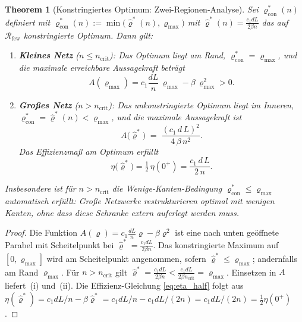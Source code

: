 ﻿\documentclass[12pt, a4paper, openany]{report}
\newtheorem{theorem}{Theorem}[chapter]
\newcommand{\calR}{\mathcal{R}}
\begin{document}
\begin{theorem}[Konstringiertes Optimum: Zwei-Regionen-Analyse]
\label{thm:scaling}
Sei $\varrho^*_{\mathrm{con}}(n)$ definiert mit $\varrho^*_{\mathrm{con}}(n) := \min\!\bigl(\hat{\varrho}^*(n),
\varrho_{\max}\bigr)$ mit $\hat{\varrho}^*(n) = \frac{c_1 d L}{2\beta n}$
das auf $\calR_{\mathrm{few}}$ konstringierte Optimum.  Dann gilt:
\begin{enumerate}[label=(\roman*)]
  \item \textbf{Kleines Netz} ($n \leq n_{\mathrm{crit}}$):
    Das Optimum liegt am Rand, $\varrho^*_{\mathrm{con}} = \varrho_{\max}$,
    und die maximale erreichbare Aussagekraft beträgt
    \[
      A(\varrho_{\max})
      = c_1 \frac{d L}{n}\,\varrho_{\max} - \beta\,\varrho_{\max}^2
      > 0.
    \]
  \item \textbf{Großes Netz} ($n > n_{\mathrm{crit}}$):
    Das unkonstringierte Optimum liegt im Inneren,
    $\varrho^*_{\mathrm{con}} = \hat{\varrho}^*(n) < \varrho_{\max}$,
    und die maximale Aussagekraft ist
    \begin{equation}
      \label{eq:A_opt}
      A\!\bigl(\hat{\varrho}^*\bigr)
      \;=\; \frac{(c_1\,d\,L)^2}{4\,\beta\,n^2}.
    \end{equation}
    Das Effizienzmaß am Optimum erfüllt
    \begin{equation}
      \label{eq:eta_half}
      \eta\!\bigl(\hat{\varrho}^*\bigr) = \tfrac{1}{2}\,\eta(0^+)
      = \frac{c_1\,d\,L}{2\,n}.
    \end{equation}
\end{enumerate}
Insbesondere ist für $n > n_{\mathrm{crit}}$ die Wenige-Kanten-Bedingung
$\varrho^*_{\mathrm{con}} \leq \varrho_{\max}$ \emph{automatisch} erfüllt:
Große Netzwerke restrukturieren optimal mit wenigen Kanten, ohne dass diese
Schranke extern auferlegt werden muss.
\end{theorem}

\begin{proof}
Die Funktion $A(\varrho) = c_1 \frac{dL}{n}\varrho - \beta\varrho^2$ ist eine
nach unten geöffnete Parabel mit Scheitelpunkt bei
$\hat\varrho^* = \frac{c_1 dL}{2\beta n}$.
Das konstringierte Maximum auf $[0, \varrho_{\max}]$ wird am Scheitelpunkt
angenommen, sofern $\hat\varrho^* \leq \varrho_{\max}$; andernfalls am Rand
$\varrho_{\max}$.  Für $n > n_{\mathrm{crit}}$ gilt
$\hat\varrho^* = \frac{c_1 dL}{2\beta n}
< \frac{c_1 dL}{2\beta n_{\mathrm{crit}}} = \varrho_{\max}$.
Einsetzen in $A$ liefert~(i) und~(ii).  Die Effizienz-Gleichung
\eqref{eq:eta_half} folgt aus $\eta(\hat\varrho^*) = c_1 dL/n
- \beta \hat\varrho^* = c_1 dL/n - c_1 dL/(2n) = c_1 dL/(2n)
= \tfrac{1}{2}\eta(0^+)$.
\end{proof}
\end{document}
